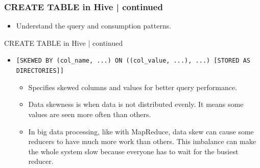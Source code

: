 \begin{frame}[fragile]
\frametitle{CREATE TABLE in Hive | continued}    
\vspace{-0.5cm}		
\begin{tcolorbox}[colback=white,colframe=black,title= Part 6: Clustering and Sorting | Conclusion]
		\begin{itemize}
			\item Understand the query and consumption patterns.
		\end{itemize}
\end{tcolorbox}
\end{frame}
\begin{frame}{CREATE TABLE in Hive | continued}
	\begin{tcolorbox}[colback=white,colframe=black,title= Part 7: Data Skewing]
		\small
	\begin{itemize}
	  \item \texttt{[SKEWED BY (col\_name, ...) ON ((col\_value, ...), ...) [STORED AS DIRECTORIES]]}
	  \begin{itemize}
		\item Specifies skewed columns and values for better query performance.
		\item Data skewness is when data is not distributed evenly. It means some values are seen more often than others.
		\item In big data processing, like with MapReduce, data skew can cause some reducers to have much more work than others. This imbalance can make the whole system slow because everyone has to wait for the busiest reducer.
	  \end{itemize}
	\end{itemize}
	\end{tcolorbox}
  \end{frame}
  

